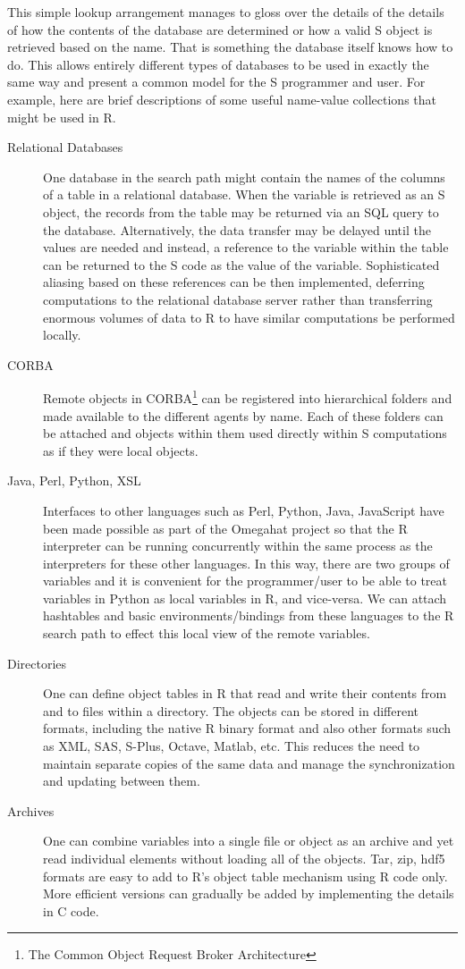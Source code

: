 \documentclass{article}
\begin{document}
This simple lookup arrangement manages to gloss over the details of
the details of how the contents of the database are determined or how
a valid S object is retrieved based on the name. That is something the
database itself knows how to do. This allows entirely different types
of databases to be used in exactly the same way and present a common
model for the S programmer and user.  For example, here are brief
descriptions of some useful name-value collections that might be used
in R.
\begin{description}
\item[Relational Databases] One database in the search path might
  contain the names of the columns of a table in a relational
  database. When the variable is retrieved as an S object, the records
  from the table may be returned via an SQL query to the database.
  Alternatively, the data transfer may be delayed until the values are
  needed and instead, a reference to the variable within the table can
  be returned to the S code as the value of the variable.
  Sophisticated aliasing based on these references can be then
  implemented, deferring computations to the relational database
  server rather than transferring enormous volumes of data to R to
  have similar computations be performed locally.

\item[CORBA] Remote objects in CORBA\footnote{The Common Object
    Request Broker Architecture} can be registered into hierarchical
  folders and made available to the different agents by name.
  Each of these folders can be attached and objects within them
  used directly within S computations as if they were local objects.

\item[Java, Perl, Python, XSL] Interfaces to other languages such as
  Perl, Python, Java, JavaScript have been made possible as part of
  the Omegahat project so that the R interpreter can be running
  concurrently within the same process as the interpreters for these
  other languages.  In this way, there are two groups of variables and
  it is convenient for the programmer/user to be able to treat
  variables in Python as local variables in R, and vice-versa. We can
  attach hashtables and basic environments/bindings from these
  languages to the R search path to effect this local view of the
  remote variables.
\item[Directories] One can define object tables in R that read and
  write their contents from and to files within a directory. The
  objects can be stored in different formats, including the native R
  binary format and also other formats such as XML, SAS, S-Plus,
  Octave, Matlab, etc.  This reduces the need to maintain separate
  copies of the same data and manage the synchronization and updating
  between them.
\item[Archives]
 One can combine variables into a single file or object
 as an archive and yet read individual elements without loading
 all of the objects. Tar, zip, hdf5 formats are easy to add to R's
 object table mechanism using R code only. More efficient versions
 can gradually be added by implementing the details in C code.
 

\end{description}
\end{document}
